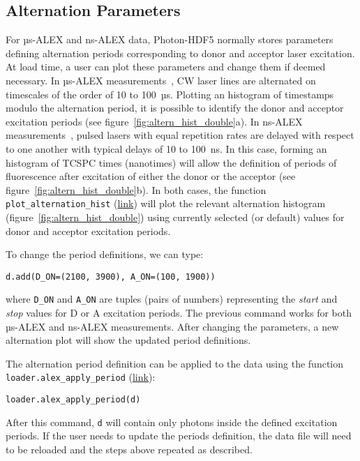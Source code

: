\subsection{Alternation Parameters}
\label{sec:alternation}

For µs-ALEX and ns-ALEX data, Photon-HDF5 normally stores parameters defining
alternation periods corresponding to donor and acceptor laser excitation.
At load time, a user can plot these parameters and change them if deemed necessary.
In µs-ALEX measurements~\cite{Kapanidis_2004},
CW laser lines are alternated on timescales of the order of 10 to 100~µs.
Plotting an histogram of timestamps modulo the alternation period, it
is possible to identify the donor and acceptor excitation periods (see figure~\ref{fig:altern_hist_double}a).
In ns-ALEX measurements~\cite{Laurence_2005},
pulsed lasers with equal repetition rates are delayed with respect 
to one another with typical delays of 10 to 100~ns.
In this case, forming an histogram of TCSPC times (nanotimes) will allow 
the definition of periods of fluorescence after excitation 
of either the donor or the acceptor (see figure~\ref{fig:altern_hist_double}b).
In both cases, the function
\verb|plot_alternation_hist| 
(\href{http://fretbursts.readthedocs.org/en/latest/plots.html#fretbursts.burst_plot.plot_alternation_hist}{link})
will plot the relevant alternation histogram (figure~\ref{fig:altern_hist_double}) 
using currently selected (or default) values for donor and acceptor excitation periods.

To change the period definitions, we can type:

\begin{lstlisting}
d.add(D_ON=(2100, 3900), A_ON=(100, 1900))
\end{lstlisting}

where \verb|D_ON| and \verb|A_ON| are tuples (pairs of numbers) representing
the \textit{start} and \textit{stop} values for D or A excitation periods.
The previous command works for both µs-ALEX and ns-ALEX measurements.
After changing the parameters, a new alternation plot will show the updated 
period definitions.

The alternation period definition can be applied to the data 
using the function \verb|loader.alex_apply_period|
(\href{http://fretbursts.readthedocs.org/en/latest/loader.html#fretbursts.loader.alex_apply_period}{link}):

\begin{lstlisting}
loader.alex_apply_period(d)
\end{lstlisting}

After this command, \verb|d| will contain only photons inside the defined excitation periods.
If the user needs to update the periods definition, the data file will need to be 
reloaded and the steps above repeated as described.
